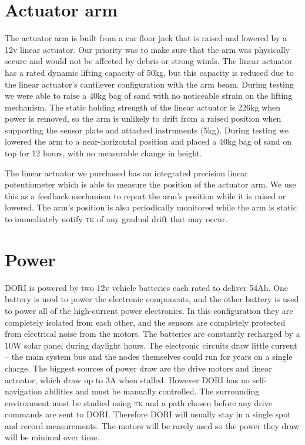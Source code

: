     \section{Actuator arm}
    The actuator arm is built from a car floor jack that is raised and lowered by a 12v linear actuator. Our priority was to make sure that the arm was physically secure and would not be affected by debris or strong winds. The linear actuator has a rated dynamic lifting capacity of 50kg, but this capacity is reduced due to the linear actuator's cantilever configuration with the arm beam. During testing we were able to raise a 40kg bag of sand with no noticeable strain on the lifting mechanism. The static holding strength of the linear actuator is 226kg when power is removed, so the arm is unlikely to drift from a raised position when supporting the sensor plate and attached instruments (5kg). During testing we lowered the arm to a near-horizontal position and placed a 40kg bag of sand on top for 12 hours, with no measurable change in height.

    The linear actuator we purchased has an integrated precision linear potentiometer which is able to measure the position of the actuator arm. We use this as a feedback mechanism to report the arm's position while it is raised or lowered. The arm's position is also periodically monitored while the arm is static to immediately notify \textsc{tk} of any gradual drift that may occur.

    \section{Power}
    DORI is powered by two 12v vehicle batteries each rated to deliver 54Ah. One battery is used to power the electronic components, and the other battery is used to power all of the high-current power electronics. In this configuration they are completely isolated from each other, and the sensors are completely protected from electrical noise from the motors. The batteries are constantly recharged by a 10W solar panel during daylight hours. The electronic circuits draw little current -- the main system bus and the nodes themselves could run for years on a single charge. The biggest sources of power draw are the drive motors and linear actuator, which draw up to 3A when stalled. However DORI has no self-navigation abilities and must be manually controlled. The surrounding environment must be studied using \textsc{tk} and a path chosen before any drive commands are sent to DORI. Therefore DORI will usually stay in a single spot and record measurements. The motors will be rarely used so the power they draw will be minimal over time.

